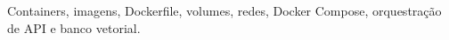 
Containers, imagens, Dockerfile, volumes, redes, Docker Compose, orquestração de API e banco vetorial.

